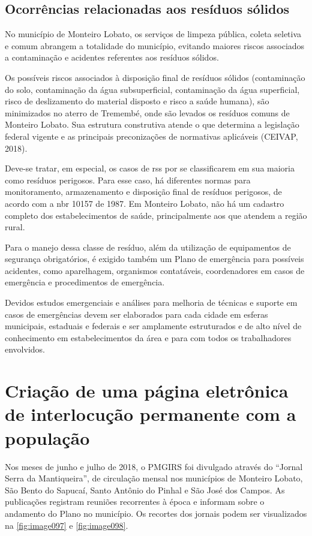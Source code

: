 \subsection{Ocorrências relacionadas aos resíduos sólidos}
No município de Monteiro Lobato, os serviços de limpeza pública, coleta seletiva e comum abrangem a totalidade do município, evitando maiores riscos associados a contaminação e acidentes referentes aos resíduos sólidos.

Os possíveis riscos associados à disposição final de resíduos sólidos (contaminação do solo, contaminação da água subsuperficial, contaminação da água superficial, risco de deslizamento do material disposto e risco a saúde humana), são minimizados no aterro de Tremembé, onde são levados os resíduos comuns de Monteiro Lobato. Sua estrutura construtiva atende o que determina a legislação federal vigente e as principais preconizações de normativas aplicáveis (CEIVAP, 2018).

Deve-se tratar, em especial, os casos de \gls{rss} por se classificarem em sua maioria como resíduos perigosos. Para esse caso, há diferentes normas para monitoramento, armazenamento e disposição final de resíduos perigosos, de acordo com a \gls{nbr} 10157 de 1987. Em Monteiro Lobato, não há um cadastro completo dos estabelecimentos de saúde, principalmente aos que atendem a região rural.

Para o manejo dessa classe de resíduo, além da utilização de equipamentos de segurança obrigatórios, é exigido também um Plano de emergência para possíveis acidentes, como aparelhagem, organismos contatáveis, coordenadores em casos de emergência e procedimentos de emergência.

Devidos estudos emergenciais e análises para melhoria de técnicas e suporte em casos de emergências devem ser elaborados para cada cidade em esferas municipais, estaduais e federais e ser amplamente estruturados e de alto nível de conhecimento em estabelecimentos da área e para com todos os trabalhadores envolvidos.


\section{Criação de uma página eletrônica de interlocução permanente com a população}

Nos meses de junho e julho de 2018, o PMGIRS foi divulgado através do “Jornal Serra da Mantiqueira”, de circulação mensal nos municípios de Monteiro Lobato, São Bento do Sapucaí, Santo Antônio do Pinhal e São José dos Campos. As publicações registram reuniões recorrentes à época e informam sobre o andamento do Plano no município. Os recortes dos jornais podem ser visualizados na \autoref{fig:image097} e \autoref{fig:image098}.

